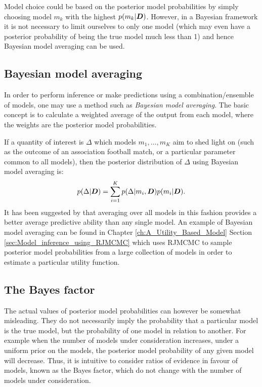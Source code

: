 Model choice could be based on the posterior model probabilities by simply choosing model \(m_k\) with the highest
\(p(m_k | \boldsymbol{D})\). However, in a Bayesian framework it is not necessary to limit ourselves to only one model (which may
even have a posterior probability of being the true model much less than 1) and hence Bayesian model averaging can be
used.

\subsection{Bayesian model averaging}
\label{sec:Bayesian_model_averaging}

In order to perform inference or make predictions using a combination/ensemble of models, one may use a method such as
\textit{Bayesian model averaging}. The basic concept is to calculate a weighted average of the output from each model,
where the weights are the posterior model probabilities.

If a quantity of interest is \(\Delta\) which models \(m_1, \ldots, m_K\) aim to shed light on (such as the outcome of
an association football match, or a particular parameter common to all models), then the posterior distribution of
\(\Delta\) using Bayesian model averaging is:
\begin{align} 
p(\Delta | \boldsymbol{D}) = \sum_{i=1}^{K} p(\Delta | m_i, \boldsymbol{D}) p(m_i | \boldsymbol{D}).
\end{align}
It has been suggested by \cite{hoeting1999, madigan1994} that averaging over all models in this fashion provides a
better average predictive ability than any single model. An example of Bayesian model averaging can be found in Chapter
\ref{ch:A_Utility_Based_Model} Section \ref{sec:Model_inference_using_RJMCMC} which uses \gls{RJMCMC} to sample
posterior model probabilities from a large collection of models in order to estimate a particular utility function.

\subsection{The Bayes factor}
\label{sec:Bayes_factor}

The actual values of posterior model probabilities can however be somewhat misleading. They do not necessarily imply the
probability that a particular model is the true model, but the probability of one model in relation to another. For
example when the number of models under consideration increases, under a uniform prior on the models, the posterior
model probability of any given model will decrease. Thus, it is intuitive to consider ratios of evidence in favour of
models, known as the Bayes factor, which do not change with the number of models under consideration.

